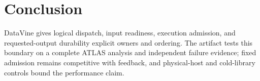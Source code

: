 \section{Conclusion}
DataVine gives logical dispatch, input readiness, execution admission, and
requested-output durability explicit owners and ordering. The artifact tests
this boundary on a complete ATLAS analysis and independent failure evidence;
fixed admission remains competitive with feedback, and physical-host and
cold-library controls bound the performance claim.
